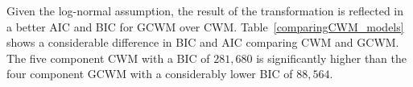 \documentclass[12pt,letterpaper]{article}
\numberwithin{equation}{section}
\numberwithin{equation}{section}
\numberwithin{equation}{section}
\begin{document}
Given the log-normal assumption, the result of the transformation is reflected in a better AIC and BIC for GCWM over CWM. Table~\ref{comparingCWM_models} shows a considerable difference in BIC and AIC comparing CWM and GCWM. The five component CWM with a BIC of $281,680$ is significantly higher than the four component GCWM with a considerably lower BIC of $88,564$.
\begin{table}[!htbp] \centering
  \caption{Comparison of AIC and BIC for CWM versus GCWM for $K$ number of clusters estimated. }\label{comparingCWM_models}
\end{table}
\end{document}
